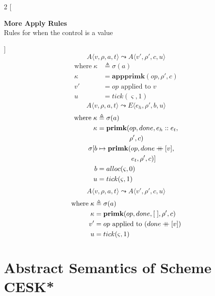 \documentclass[12pt,draft]{article}
\newcommand\mdoubleplus{\ensuremath{\mathbin{+\mkern-9mu+}}}
\begin{document}

\newpage
\begin{multicols*}{2}
[
\begin{center}
\textbf{More Apply Rules} \\
Rules for when the control is a value
\end{center}
]
\[
A\langle
v , \rho , a , t
\rangle
\leadsto
A\langle
v' , \rho' , c , u
\rangle
\]
\vspace{-13mm}
\begin{align*}
\text{where}\; \kappa &\triangleq \sigma(a) \\
\kappa &= \textbf{appprimk}(op, \rho', c) \\
v' &= op \text{ applied to } v \\
u &= tick(\varsigma, 1)
\end{align*}
\[
A\langle
v , \rho , a , t
\rangle
\leadsto
E\langle
e_h , \rho' , b , u
\rangle
\]
\vspace{-10mm}
\begin{align*}
\text{where}\; \kappa &\triangleq \sigma(a)\\
\kappa &= \textbf{primk}(op, done, e_h::e_t, \\
&\;\;\;\;\;\;\;\;\;\;\;\;\;\;\;\;\; \rho', c) \\
\sigma[b &\mapsto \textbf{primk}(op, done \mdoubleplus [v], \\
&\;\;\;\;\;\;\;\;\;\;\;\;\;\;\;\;\;\; e_t, \rho', c)] \\
b &= alloc(\varsigma, 0) \\
u &= tick(\varsigma, 1)
\end{align*}
\[
A\langle
v , \rho , a , t
\rangle
\leadsto
A\langle
v' , \rho' , c , u
\rangle
\]
\vspace{-10mm}
\begin{align*}
\text{where}\; \kappa &\triangleq \sigma(a)\\
\kappa &= \textbf{primk}(op, done, [\;], \rho', c) \\
v' &= op \text{ applied to } (done \mdoubleplus [v]) \\
u &= tick(\varsigma, 1)
\end{align*}



\end{multicols*}
\newpage

\section{Abstract Semantics of Scheme CESK*}
\end{document}
